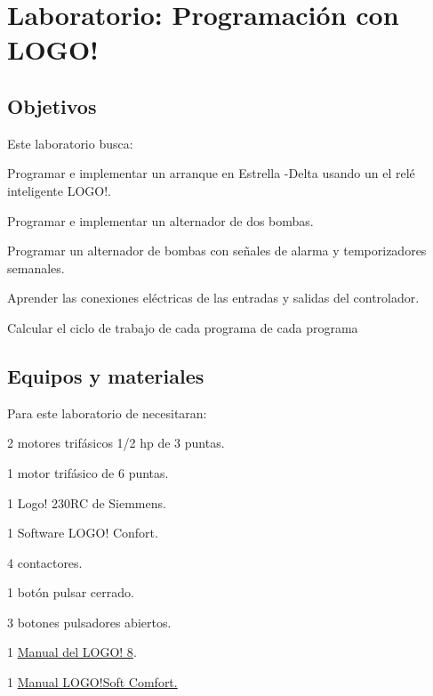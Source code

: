 
\chapter{Laboratorio:  Programación con LOGO!}
	  

\section{Objetivos}
Este  laboratorio busca:
\begin{itemize}
	{\small
    \item Programar e implementar un arranque en Estrella -Delta usando un el relé inteligente LOGO!.
    \item Programar e implementar un alternador de dos bombas.
    \item Programar un alternador de bombas con señales de alarma y temporizadores semanales.
    \item Aprender las conexiones eléctricas de las entradas y salidas del controlador.
    \item Calcular el ciclo de trabajo de cada programa de cada programa 
 }
\end{itemize} 

 
\section{Equipos y materiales}
Para este laboratorio de necesitaran:
\begin{itemize}
	{\small \item 2 motores trifásicos 1/2 hp de 3 puntas.
		\item 1 motor trifásico de 6 puntas.
	\item 1 Logo! 230RC de Siemmens.
	\item 1 Software LOGO! Confort.
	\item 4 contactores.
	\item 1 botón pulsar cerrado.
	\item 3 botones pulsadores abiertos.
	\item 1 \href{https://cache.industry.siemens.com/dl/files/041/109741041/att_924629/v1/logo_system_manual_es-ES_es-ES.pdf}{Manual del LOGO! 8}.
	\item 1 \href{https://cache.industry.siemens.com/dl/files/807/100782807/att_924633/v1/Help_es-ES_es-ES.pdf}{Manual LOGO!Soft Comfort.}
}
\end{itemize}

